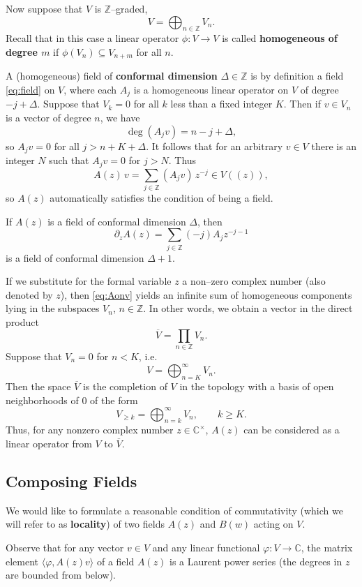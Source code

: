 \documentclass[12pt]{article}
\begin{document}
Now suppose that $V$ is $\mathbb{Z}$–graded,
\[
V = \bigoplus_{n \in \mathbb{Z}} V_n.
\]
Recall that in this case a linear operator $\phi : V \to V$ is called \textbf{homogeneous of degree $m$} if $\phi(V_n) \subseteq V_{n+m}$ for all $n$.

A (homogeneous) field of \textbf{conformal dimension} $\Delta \in \mathbb{Z}$ is by definition a field \eqref{eq:field} on $V$, where each $A_j$ is a homogeneous linear operator on $V$ of degree $-j + \Delta$.
Suppose that $V_k = 0$ for all $k$ less than a fixed integer $K$.  
Then if $v \in V_n$ is a vector of degree $n$, we have
\[
\deg(A_j v) = n - j + \Delta,
\]
so $A_j v = 0$ for all $j > n + K + \Delta$.  
It follows that for an arbitrary $v \in V$ there is an integer $N$ such that $A_j v = 0$ for $j > N$. Thus
\begin{equation}\label{eq:Aonv}
A(z)\,v = \sum_{j \in \mathbb{Z}} (A_j v)\, z^{-j} \in V((z)),
\end{equation}
so $A(z)$ automatically satisfies the condition of being a field.

\medskip

If $A(z)$ is a field of conformal dimension $\Delta$, then
\[
\partial_z A(z) = \sum_{j \in \mathbb{Z}} (-j) A_j z^{-j-1}
\]
is a field of conformal dimension $\Delta + 1$.

\medskip

If we substitute for the formal variable $z$ a non–zero complex number (also denoted by $z$), then \eqref{eq:Aonv} yields an infinite sum of homogeneous components lying in the subspaces $V_n$, $n \in \mathbb{Z}$.  
In other words, we obtain a vector in the direct product
\[
\overline{V} = \prod_{n \in \mathbb{Z}} V_n.
\]
Suppose that $V_n = 0$ for $n < K$, i.e.
\[
V = \bigoplus_{n=K}^{\infty} V_n.
\]
Then the space $\overline{V}$ is the completion of $V$ in the topology with a basis of open neighborhoods of $0$ of the form
\[
V_{\ge k} = \bigoplus_{n=k}^{\infty} V_n, \qquad k \ge K.
\]
Thus, for any nonzero complex number $z \in \mathbb{C}^\times$, $A(z)$ can be considered as a linear operator from $V$ to $\overline{V}$.
\subsection{Composing Fields}

We would like to formulate a reasonable condition of commutativity (which we will refer to as \textbf{locality}) of two fields $A(z)$ and $B(w)$ acting on $V$.

Observe that for any vector $v \in V$ and any linear functional $\varphi : V \to \mathbb{C}$, the matrix element $\langle \varphi, A(z)v \rangle$ of a field $A(z)$ is a Laurent power series (the degrees in $z$ are bounded from below).
\end{document}

